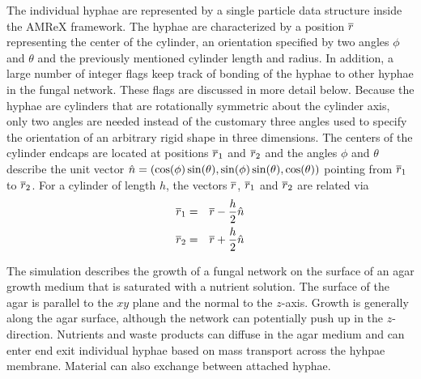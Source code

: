 \documentclass[12pt]{article}
\begin{document}
The individual hyphae are represented by a single particle data structure inside
the AMReX framework. The hyphae are characterized by a position $\overline{r}$
representing the center of the cylinder, an orientation
specified by two angles $\phi$ and $\theta$ and the previously mentioned cylinder
length and radius. In addition, a large number of integer flags keep track of
bonding of the hyphae to other hyphae in the fungal network. These flags are
discussed in more detail below. Because the hyphae are cylinders that are rotationally
symmetric about the cylinder axis, only two angles are needed instead of the
customary three angles used to specify the orientation of an arbitrary rigid shape
in three dimensions. The centers of the cylinder endcaps are located at positions
$\overline{r}_1$ and $\overline{r}_2$ and the angles $\phi$ and $\theta$ describe the unit vector
$\hat{n} = (\cos(\phi)\sin(\theta),\sin(\phi)\sin(\theta),\cos(\theta))$ pointing
from $\overline{r}_1$ to $\overline{r}_2$. For a cylinder of length $h$, the vectors $\overline{r}$,
$\overline{r}_1$ and $\overline{r}_2$ are related via
\begin{eqnarray*}
\overline{r}_1 & = & \overline{r} - \frac{h}{2}\hat{n} \\
\overline{r}_2 & = & \overline{r} + \frac{h}{2}\hat{n}
\end{eqnarray*}

The simulation describes the growth of a fungal network on the surface of an agar
growth medium that is saturated with a nutrient solution. The surface of the
agar is parallel to the $xy$ plane and the normal to the $z$-axis. Growth is
generally along the agar surface, although the network can potentially push up
in the $z$-direction. Nutrients and waste products can diffuse in the agar
medium and can enter end exit individual hyphae based on mass transport across
the hyhpae membrane. Material can also exchange between attached hyphae.
\end{document}
